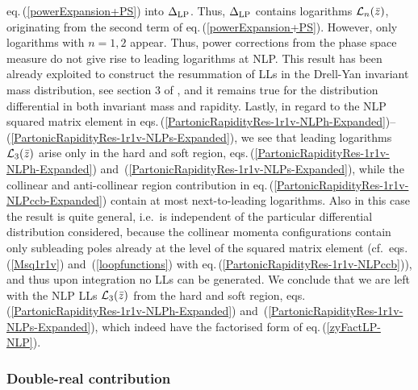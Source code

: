 \documentclass[11pt]{article}
\newcommand\eqn[1]     {eq.\,(\ref{#1})}
\newcommand\eqns[2]    {eqs.\,(\ref{#1}) and~(\ref{#2})}
\newcommand\eqnss[2]   {eqs.\,(\ref{#1})--(\ref{#2})}
\begin{document}
\eqn{powerExpansion+PS} into 
$\Delta_{\rm LP}$. Thus, $\Delta_{\rm LP}$
contains logarithms ${\cal L}_n(\bar z)$,
originating from the second term of 
\eqn{powerExpansion+PS}. However, only 
logarithms with $n = 1,2$ appear. Thus, 
power corrections from the phase space 
measure do not give rise to leading 
logarithms at NLP. This result has been 
already exploited to construct the 
resummation of LLs in the Drell-Yan 
invariant mass distribution, see section 
3 of \cite{Bahjat-Abbas:2019fqa}, and 
it remains true for the distribution 
differential in both invariant
mass and rapidity. Lastly, in regard to the NLP squared matrix element in 
\eqnss{PartonicRapidityRes-1r1v-NLPh-Expanded}{PartonicRapidityRes-1r1v-NLPs-Expanded},
we see that leading logarithms 
${\cal L}_3(\bar z)$ arise only in the 
hard and soft region, 
\eqns{PartonicRapidityRes-1r1v-NLPh-Expanded}{PartonicRapidityRes-1r1v-NLPs-Expanded}, 
while the collinear and anti-collinear 
region contribution in 
\eqn{PartonicRapidityRes-1r1v-NLPccb-Expanded}
contain at most next-to-leading logarithms.
Also in this case the 
result is quite general, i.e.\ 
is independent of the particular 
differential distribution considered, 
because the collinear momenta 
configurations contain only subleading 
poles already at the level of the 
squared matrix element (cf.\ 
\eqns{Msq1r1v}{loopfunctions} with 
\eqn{PartonicRapidityRes-1r1v-NLPccb}),
and thus upon integration no LLs 
can be generated. We conclude that we are left with the NLP 
LLs ${\cal L}_3(\bar z)$ from 
the hard and soft region, 
\eqns{PartonicRapidityRes-1r1v-NLPh-Expanded}{PartonicRapidityRes-1r1v-NLPs-Expanded}, 
which indeed have the factorised 
form of \eqn{zyFactLP-NLP}.


\subsubsection*{Double-real contribution}
\end{document}
